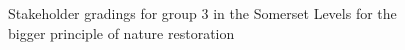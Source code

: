 \documentclass[
  12pt,
  letterpaper,
  DIV=11,
  numbers=noendperiod]{scrartcl}
\begin{document}
\begin{figure}[H]


\caption{\label{fig-SomBigG3}Stakeholder gradings for group 3 in the
Somerset Levels for the bigger principle of nature restoration}

\end{figure}%
\end{document}
